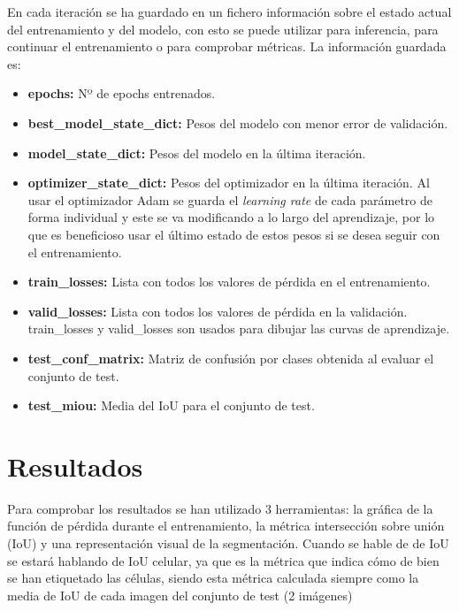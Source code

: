 En cada iteración se ha guardado en un fichero información sobre el estado actual del entrenamiento y del modelo, con esto se puede utilizar para inferencia, para continuar el entrenamiento o para comprobar métricas. La información guardada es:

\begin{itemize}
\item \textbf{epochs:} Nº de epochs entrenados.
\item \textbf{best\_model\_state\_dict:} Pesos del modelo con menor error de validación.
\item \textbf{model\_state\_dict:} Pesos del modelo en la última iteración.
\item \textbf{optimizer\_state\_dict:} Pesos del optimizador en la última iteración. Al usar el optimizador Adam se guarda el \textit{learning rate} de cada parámetro de forma individual y este se va modificando a lo largo del aprendizaje, por lo que es beneficioso usar el último estado de estos pesos si se desea seguir con el entrenamiento.
\item \textbf{train\_losses:} Lista con todos los valores de pérdida en el entrenamiento.
\item \textbf{valid\_losses:} Lista con todos los valores de pérdida en la validación. train\_losses y valid\_losses son usados para dibujar las curvas de aprendizaje.
\item \textbf{test\_conf\_matrix:} Matriz de confusión por clases obtenida al evaluar el conjunto de test.
\item \textbf{test\_miou:} Media del IoU para el conjunto de test.
\end{itemize}

\section{Resultados}\label{sec:initial_system_resultados}

Para comprobar los resultados se han utilizado 3 herramientas: la gráfica de la función de pérdida durante el entrenamiento, la métrica intersección sobre unión (IoU) y una representación visual de la segmentación. Cuando se hable de de IoU se estará hablando de IoU celular, ya que es la métrica que indica cómo de bien se han etiquetado las células, siendo esta métrica calculada  siempre como la media de IoU de cada imagen del conjunto de test (2 imágenes)

